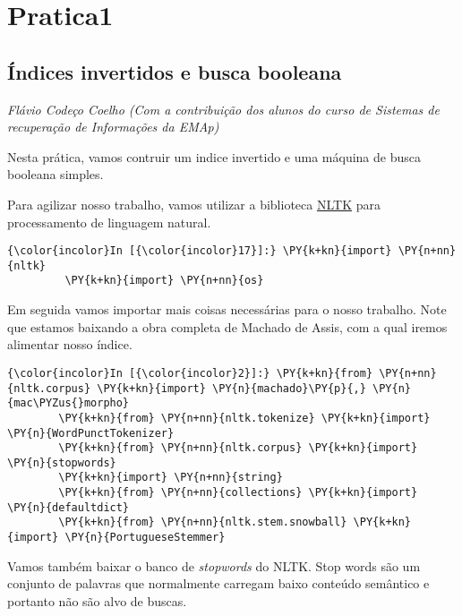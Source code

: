 \chapter{Pratica1}

    
    

    
    \section{Índices invertidos e busca
booleana}\label{uxedndices-invertidos-e-busca-booleana}

\emph{Flávio Codeço Coelho (Com a contribuição dos alunos do curso de
Sistemas de recuperação de Informações da EMAp)}

Nesta prática, vamos contruir um indice invertido e uma máquina de busca
booleana simples.

Para agilizar nosso trabalho, vamos utilizar a biblioteca
\href{http://nltk.org}{NLTK} para processamento de linguagem natural.

    \begin{Verbatim}[commandchars=\\\{\}]
{\color{incolor}In [{\color{incolor}17}]:} \PY{k+kn}{import} \PY{n+nn}{nltk}
         \PY{k+kn}{import} \PY{n+nn}{os}
\end{Verbatim}

    Em seguida vamos importar mais coisas necessárias para o nosso trabalho.
Note que estamos baixando a obra completa de Machado de Assis, com a
qual iremos alimentar nosso índice.

    \begin{Verbatim}[commandchars=\\\{\}]
{\color{incolor}In [{\color{incolor}2}]:} \PY{k+kn}{from} \PY{n+nn}{nltk.corpus} \PY{k+kn}{import} \PY{n}{machado}\PY{p}{,} \PY{n}{mac\PYZus{}morpho}
        \PY{k+kn}{from} \PY{n+nn}{nltk.tokenize} \PY{k+kn}{import} \PY{n}{WordPunctTokenizer}
        \PY{k+kn}{from} \PY{n+nn}{nltk.corpus} \PY{k+kn}{import} \PY{n}{stopwords}
        \PY{k+kn}{import} \PY{n+nn}{string}
        \PY{k+kn}{from} \PY{n+nn}{collections} \PY{k+kn}{import} \PY{n}{defaultdict}
        \PY{k+kn}{from} \PY{n+nn}{nltk.stem.snowball} \PY{k+kn}{import} \PY{n}{PortugueseStemmer}
\end{Verbatim}

    Vamos também baixar o banco de \emph{stopwords} do NLTK. Stop words são
um conjunto de palavras que normalmente carregam baixo conteúdo
semântico e portanto não são alvo de buscas.

